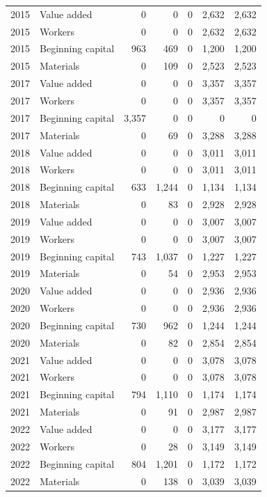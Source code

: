 \begin{longtable}{llrrrrr}
2015 & Value added & 0 & 0 & 0 & 2,632 & 2,632 \\
2015 & Workers & 0 & 0 & 0 & 2,632 & 2,632 \\
2015 & Beginning capital & 963 & 469 & 0 & 1,200 & 1,200 \\
2015 & Materials & 0 & 109 & 0 & 2,523 & 2,523 \\
2017 & Value added & 0 & 0 & 0 & 3,357 & 3,357 \\
2017 & Workers & 0 & 0 & 0 & 3,357 & 3,357 \\
2017 & Beginning capital & 3,357 & 0 & 0 & 0 & 0 \\
2017 & Materials & 0 & 69 & 0 & 3,288 & 3,288 \\
2018 & Value added & 0 & 0 & 0 & 3,011 & 3,011 \\
2018 & Workers & 0 & 0 & 0 & 3,011 & 3,011 \\
2018 & Beginning capital & 633 & 1,244 & 0 & 1,134 & 1,134 \\
2018 & Materials & 0 & 83 & 0 & 2,928 & 2,928 \\
2019 & Value added & 0 & 0 & 0 & 3,007 & 3,007 \\
2019 & Workers & 0 & 0 & 0 & 3,007 & 3,007 \\
2019 & Beginning capital & 743 & 1,037 & 0 & 1,227 & 1,227 \\
2019 & Materials & 0 & 54 & 0 & 2,953 & 2,953 \\
2020 & Value added & 0 & 0 & 0 & 2,936 & 2,936 \\
2020 & Workers & 0 & 0 & 0 & 2,936 & 2,936 \\
2020 & Beginning capital & 730 & 962 & 0 & 1,244 & 1,244 \\
2020 & Materials & 0 & 82 & 0 & 2,854 & 2,854 \\
2021 & Value added & 0 & 0 & 0 & 3,078 & 3,078 \\
2021 & Workers & 0 & 0 & 0 & 3,078 & 3,078 \\
2021 & Beginning capital & 794 & 1,110 & 0 & 1,174 & 1,174 \\
2021 & Materials & 0 & 91 & 0 & 2,987 & 2,987 \\
2022 & Value added & 0 & 0 & 0 & 3,177 & 3,177 \\
2022 & Workers & 0 & 28 & 0 & 3,149 & 3,149 \\
2022 & Beginning capital & 804 & 1,201 & 0 & 1,172 & 1,172 \\
2022 & Materials & 0 & 138 & 0 & 3,039 & 3,039 \\
\end{longtable}
\endgroup
{}
